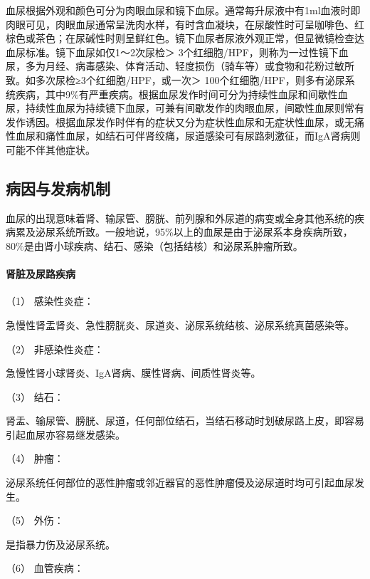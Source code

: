 血尿根据外观和颜色可分为肉眼血尿和镜下血尿。通常每升尿液中有1ml血液时即肉眼可见，肉眼血尿通常呈洗肉水样，有时含血凝块，在尿酸性时可呈咖啡色、红棕色或茶色；在尿碱性时则呈鲜红色。镜下血尿者尿液外观正常，但显微镜检查达血尿标准。镜下血尿如仅1～2次尿检＞
3个红细胞/HPF，则称为一过性镜下血尿，多为月经、病毒感染、体育活动、轻度损伤（骑车等）或食物和花粉过敏所致。如多次尿检≥3个红细胞/HPF，或一次＞
100个红细胞/HPF，则多有泌尿系统疾病，其中9\%有严重疾病。根据血尿发作时间可分为持续性血尿和间歇性血尿，持续性血尿为持续镜下血尿，可兼有间歇发作的肉眼血尿，间歇性血尿则常有发作诱因。根据血尿发作时伴有的症状又分为症状性血尿和无症状性血尿，或无痛性血尿和痛性血尿，如结石可伴肾绞痛，尿道感染可有尿路刺激征，而IgA肾病则可能不伴其他症状。

\subsection{病因与发病机制}

血尿的出现意味着肾、输尿管、膀胱、前列腺和外尿道的病变或全身其他系统的疾病累及泌尿系统所致。一般地说，95\%以上的血尿是由于泌尿系本身疾病所致，80\%是由肾小球疾病、结石、感染（包括结核）和泌尿系肿瘤所致。

\paragraph{肾脏及尿路疾病}

\hypertarget{text00037.htmlux5cux23CHP1-15-1-1-1}{}
（1） 感染性炎症：

急慢性肾盂肾炎、急性膀胱炎、尿道炎、泌尿系统结核、泌尿系统真菌感染等。

\hypertarget{text00037.htmlux5cux23CHP1-15-1-1-2}{}
（2） 非感染性炎症：

急慢性肾小球肾炎、IgA肾病、膜性肾病、间质性肾炎等。

\hypertarget{text00037.htmlux5cux23CHP1-15-1-1-3}{}
（3） 结石：

肾盂、输尿管、膀胱、尿道，任何部位结石，当结石移动时划破尿路上皮，即容易引起血尿亦容易继发感染。

\hypertarget{text00037.htmlux5cux23CHP1-15-1-1-4}{}
（4） 肿瘤：

泌尿系统任何部位的恶性肿瘤或邻近器官的恶性肿瘤侵及泌尿道时均可引起血尿发生。

\hypertarget{text00037.htmlux5cux23CHP1-15-1-1-5}{}
（5） 外伤：

是指暴力伤及泌尿系统。

\hypertarget{text00037.htmlux5cux23CHP1-15-1-1-6}{}
（6） 血管疾病：

